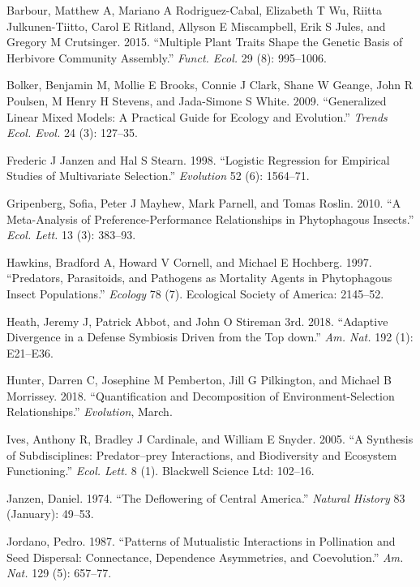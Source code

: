 \documentclass[]{elsarticle} %
\begin{document}
\hypertarget{ref-Barbour2015}{}
Barbour, Matthew A, Mariano A Rodriguez-Cabal, Elizabeth T Wu, Riitta
Julkunen-Tiitto, Carol E Ritland, Allyson E Miscampbell, Erik S Jules,
and Gregory M Crutsinger. 2015. ``Multiple Plant Traits Shape the
Genetic Basis of Herbivore Community Assembly.'' \emph{Funct. Ecol.} 29
(8): 995--1006.

\hypertarget{ref-Bolker2009}{}
Bolker, Benjamin M, Mollie E Brooks, Connie J Clark, Shane W Geange,
John R Poulsen, M Henry H Stevens, and Jada-Simone S White. 2009.
``Generalized Linear Mixed Models: A Practical Guide for Ecology and
Evolution.'' \emph{Trends Ecol. Evol.} 24 (3): 127--35.

\hypertarget{ref-Janzen1998}{}
Frederic J Janzen and Hal S Stearn. 1998. ``Logistic Regression for
Empirical Studies of Multivariate Selection.'' \emph{Evolution} 52 (6):
1564--71.

\hypertarget{ref-Gripenberg2010}{}
Gripenberg, Sofia, Peter J Mayhew, Mark Parnell, and Tomas Roslin. 2010.
``A Meta-Analysis of Preference-Performance Relationships in
Phytophagous Insects.'' \emph{Ecol. Lett.} 13 (3): 383--93.

\hypertarget{ref-Hawkins1997}{}
Hawkins, Bradford A, Howard V Cornell, and Michael E Hochberg. 1997.
``Predators, Parasitoids, and Pathogens as Mortality Agents in
Phytophagous Insect Populations.'' \emph{Ecology} 78 (7). Ecological
Society of America: 2145--52.

\hypertarget{ref-Heath2018}{}
Heath, Jeremy J, Patrick Abbot, and John O Stireman 3rd. 2018.
``Adaptive Divergence in a Defense Symbiosis Driven from the Top down.''
\emph{Am. Nat.} 192 (1): E21--E36.

\hypertarget{ref-Hunter2018}{}
Hunter, Darren C, Josephine M Pemberton, Jill G Pilkington, and Michael
B Morrissey. 2018. ``Quantification and Decomposition of
Environment-Selection Relationships.'' \emph{Evolution}, March.

\hypertarget{ref-Ives2005}{}
Ives, Anthony R, Bradley J Cardinale, and William E Snyder. 2005. ``A
Synthesis of Subdisciplines: Predator--prey Interactions, and
Biodiversity and Ecosystem Functioning.'' \emph{Ecol. Lett.} 8 (1).
Blackwell Science Ltd: 102--16.

\hypertarget{ref-Janzen1974}{}
Janzen, Daniel. 1974. ``The Deflowering of Central America.''
\emph{Natural History} 83 (January): 49--53.

\hypertarget{ref-Jordano1987}{}
Jordano, Pedro. 1987. ``Patterns of Mutualistic Interactions in
Pollination and Seed Dispersal: Connectance, Dependence Asymmetries, and
Coevolution.'' \emph{Am. Nat.} 129 (5): 657--77.
\end{document}
